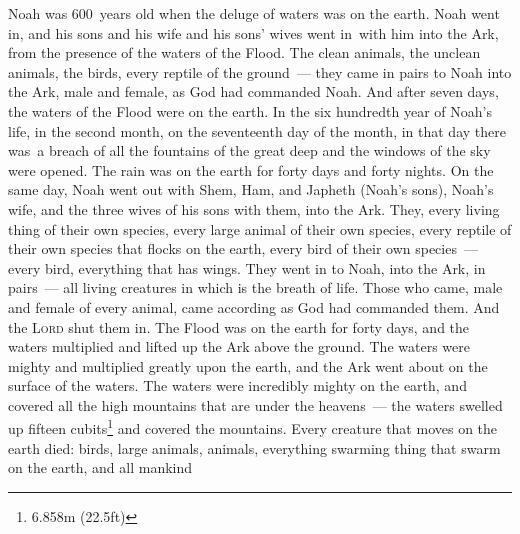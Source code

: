 \begin{inparaenum}
     Noah was 600~years old when the deluge of waters was on the earth.%
     Noah went in, and his sons and his wife and his sons' wives went in\understood\ with him into the Ark, from the presence of the waters of the Flood.%
     The clean animals, the unclean animals, the birds, every reptile of the ground~---%
     they came in pairs to Noah into the Ark, male and female, as God had commanded Noah.%
     And after seven days, the waters of the Flood were on the earth.%
     In the six hundredth year of Noah's life, in the second month, on the seventeenth day of the month, in that day there was\understood\ a breach of all the fountains of the great deep and the windows of the sky were opened.%
     The rain was on the earth for forty days and forty nights.%
     On the same day, Noah went out with Shem, Ham, and Japheth (Noah's sons), Noah's wife, and the three wives of his sons with them, into the Ark.%
     They, every living thing of their own species, every large animal of their own species, every reptile of their own species that flocks on the earth, every bird of their own species~--- every bird, everything that has wings.%
     They went in to Noah, into the Ark, in pairs~--- all living creatures in which is the breath of life.%
     Those who came, male and female of every animal, came according as God had commanded them. And the \textsc{Lord} shut them in.%
     The Flood was on the earth for forty days, and the waters multiplied and lifted up the Ark above the ground.%
     The waters were mighty and multiplied greatly upon the earth, and the Ark went about on the surface of the waters.%
     The waters were incredibly mighty on the earth, and covered all the high mountains that are under the heavens~---%
     the waters swelled up fifteen cubits\footnote{6.858\thinspace m (22.5\thinspace ft)} and covered the mountains.%
     Every creature that moves on the earth died: birds, large animals, animals, everything swarming thing that swarm on the earth, and all mankind%
\end{inparaenum}
